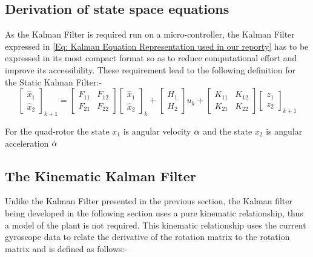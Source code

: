 \subsection{Derivation of state space equations}
As the Kalman Filter is required run on a micro-controller, the Kalman Filter expressed in  \ref{Eq: Kalman Equation Representation used in our reporty} has to be expressed in its most compact format so as to reduce computational effort and improve its accessibility. These requirement lead to the following definition for the Static Kalman Filter:-
\begin{equation}
\begin{bmatrix}																
\hat{x}_1		         			\\
\hat{ x}_2		
\end{bmatrix}_{k+1}
=
\begin{bmatrix}
F_{11}	& F_{12 } \\
F_{21}	& F_{22}
\end{bmatrix}
\begin{bmatrix}											
\hat{ x}_1		         			\\
\hat{ x}_2		
\end{bmatrix}_{k}	
+
\begin{bmatrix}
H_1 \\
H_2
\end{bmatrix}
{ u}_k
+
\begin{bmatrix}
K_{11}	& K_{12 } \\
K_{21}	& K_{22}
\end{bmatrix}
\begin{bmatrix}											
{ z}_1		         			\\
{z}_2		
\end{bmatrix}_{k+1}	
\label{eq: static kalman equations for micro}
\end{equation}

For the quad-rotor the state ${ x_1}$ is angular velocity ${\bf \alpha}$ and the state ${ x_2}$ is angular acceleration $\dot{\bf \alpha}$  


\subsection{The Kinematic Kalman Filter}
Unlike the Kalman Filter presented in the previous section, the Kalman filter being developed in the following section uses a pure kinematic relationship, thus a model of the plant is not required. This kinematic relationship uses the current gyroscope data to relate the derivative of the rotation matrix to the rotation matrix and is defined as follows:-

